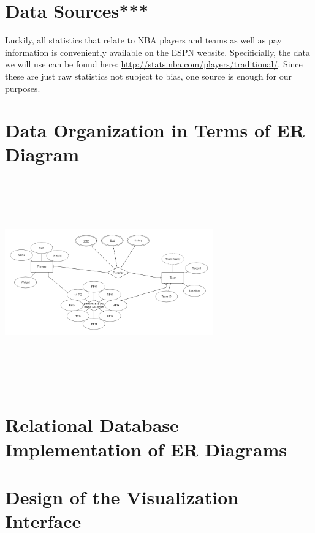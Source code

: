 \documentclass[journal]{vgtc}                %
\begin{document}
\section{Data Sources***}
Luckily, all statistics that relate to NBA players and teams as well as pay information is conveniently available on the ESPN website. Specificially, the data we will use can be found here: \url{http://stats.nba.com/players/traditional/}. Since these are just raw statistics not subject to bias, one source is enough for our purposes.

\section{Data Organization in Terms of ER Diagram}
\includegraphics[width=9cm, height=9cm]{ERdiagram}

\section{Relational Database Implementation of ER Diagrams}

\section{Design of the Visualization Interface}



\end{document}
